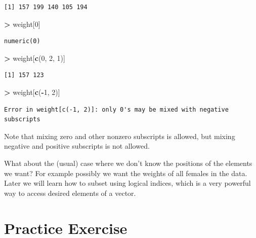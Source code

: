\documentclass[]{krantz}
\makeatletter
\newenvironment{Shaded}{\begin{snugshade}}{\end{snugshade}}
\newcommand{\DecValTok}[1]{\textcolor[rgb]{0.06,0.06,0.06}{#1}}
\newcommand{\KeywordTok}[1]{\textcolor[rgb]{0.27,0.27,0.27}{\textbf{#1}}}
\newcommand{\NormalTok}[1]{#1}
\newcommand{\OperatorTok}[1]{\textcolor[rgb]{0.43,0.43,0.43}{\textbf{#1}}}
\newcommand{\StringTok}[1]{\textcolor[rgb]{0.5,0.5,0.5}{#1}}
\newenvironment{kframe}{%
\medskip{}
\setlength{\fboxsep}{.8em}
 \def\at@end@of@kframe{}%
 \ifinner\ifhmode%
  \def\at@end@of@kframe{\end{minipage}}%
  \begin{minipage}{\columnwidth}%
 \fi\fi%
 \def\FrameCommand##1{\hskip\@totalleftmargin \hskip-\fboxsep
 \colorbox{shadecolor}{##1}\hskip-\fboxsep
     \hskip-\linewidth \hskip-\@totalleftmargin \hskip\columnwidth}%
 \MakeFramed {\advance\hsize-\width
   \@totalleftmargin\z@ \linewidth\hsize
   \@setminipage}}%
 {\par\unskip\endMakeFramed%
 \at@end@of@kframe}
\renewenvironment{Shaded}{\begin{kframe}}{\end{kframe}}
\makeatother
\begin{document}
\begin{verbatim}
[1] 157 199 140 105 194
\end{verbatim}

\begin{Shaded}
\begin{Highlighting}[]
\OperatorTok{>}\StringTok{ }\NormalTok{weight[}\DecValTok{0}\NormalTok{]}
\end{Highlighting}
\end{Shaded}

\begin{verbatim}
numeric(0)
\end{verbatim}

\begin{Shaded}
\begin{Highlighting}[]
\OperatorTok{>}\StringTok{ }\NormalTok{weight[}\KeywordTok{c}\NormalTok{(}\DecValTok{0}\NormalTok{, }\DecValTok{2}\NormalTok{, }\DecValTok{1}\NormalTok{)]}
\end{Highlighting}
\end{Shaded}

\begin{verbatim}
[1] 157 123
\end{verbatim}

\begin{Shaded}
\begin{Highlighting}[]
\OperatorTok{>}\StringTok{ }\NormalTok{weight[}\KeywordTok{c}\NormalTok{(}\OperatorTok{-}\DecValTok{1}\NormalTok{, }\DecValTok{2}\NormalTok{)]}
\end{Highlighting}
\end{Shaded}

\begin{verbatim}
Error in weight[c(-1, 2)]: only 0's may be mixed with negative subscripts
\end{verbatim}

Note that mixing zero and other nonzero subscripts is allowed, but mixing negative and positive subscripts is not allowed.

What about the (usual) case where we don't know the positions of the elements we want? For example possibly we want the weights of all females in the data. Later we will learn how to subset using logical indices, which is a very powerful way to access desired elements of a vector.

\hypertarget{practice-exercise-1}{%
\section{Practice Exercise}\label{practice-exercise-1}}
\end{document}
